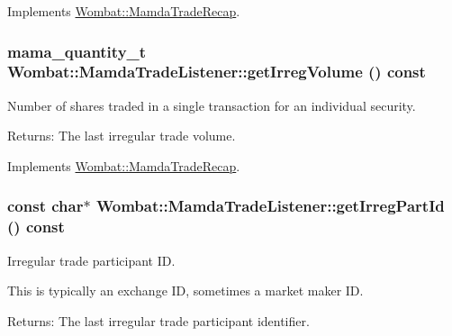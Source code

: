Implements \hyperlink{classWombat_1_1MamdaTradeRecap_5d274713697f09773b0bf6c5c30c637d}{Wombat::Mamda\-Trade\-Recap}.\hypertarget{classWombat_1_1MamdaTradeListener_9af4b2845a866803636bdd1983940a28}{
\subsubsection[getIrregVolume]{\setlength{\rightskip}{0pt plus 5cm}mama\_\-quantity\_\-t Wombat::Mamda\-Trade\-Listener::get\-Irreg\-Volume () const}}
\label{classWombat_1_1MamdaTradeListener_9af4b2845a866803636bdd1983940a28}


Number of shares traded in a single transaction for an individual security. 

\begin{Desc}
\item[Returns:]The last irregular trade volume. \end{Desc}


Implements \hyperlink{classWombat_1_1MamdaTradeRecap_b361bc0a511353d976e092fb7972018d}{Wombat::Mamda\-Trade\-Recap}.\hypertarget{classWombat_1_1MamdaTradeListener_a8ee06db46d55e03adf400ade37b18e1}{
\subsubsection[getIrregPartId]{\setlength{\rightskip}{0pt plus 5cm}const char$\ast$ Wombat::Mamda\-Trade\-Listener::get\-Irreg\-Part\-Id () const}}
\label{classWombat_1_1MamdaTradeListener_a8ee06db46d55e03adf400ade37b18e1}


Irregular trade participant ID. 

This is typically an exchange ID, sometimes a market maker ID.

\begin{Desc}
\item[Returns:]The last irregular trade participant identifier. \end{Desc}


